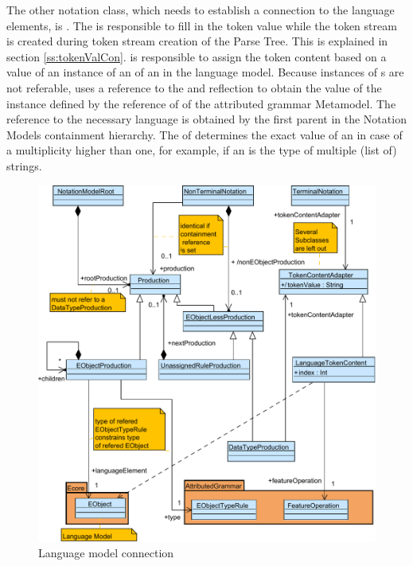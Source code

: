 The other notation class, which needs to establish a connection to the language elements, is . The  is responsible to fill in the token value while the token stream is created during token stream creation of the Parse Tree. This is explained in section \ref{ss:tokenValCon}.  is responsible to assign the token content based on a value of an instance of an  of an  in the language model. Because instances of s are not referable,  uses a reference to the  and reflection to obtain the value of the  instance defined by the  reference of  of the attributed grammar Metamodel. The reference to the necessary language  is obtained by the first parent  in the Notation Models containment hierarchy. The  of  determines the exact value of an  in case of a multiplicity higher than one, for example, if an  is the type of multiple (list of) strings. 

\begin{figure}
\centering
\includegraphics[scale=0.8]{gfx/ex/Notation_LangRel} 
\caption{Language model connection}
\label{MM:Not:LR}
\end{figure}

